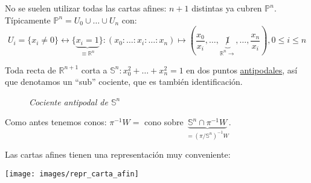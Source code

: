 \begin{defi}
No se suelen utilizar todas las cartas afines: $n + 1$ distintas ya cubren $\mathbb{P}^{n}$. Típicamente $\mathbb{P}^{n} = U_0 \cup \ldots \cup U_n$ con:
\[
    U_i = \{x_i \neq 0\} \leftrightarrow \{\underbrace{x_i = 1}_{\equiv \mathbb{R}^n}\}: \left( x_0 : \ldots : x_i : \ldots : x_n \right) \mapsto \left( \frac{x_0}{x_i}, \ldots, \underbrace{\not1}_{\mathbb{R}^n \rightarrow}, \ldots, \frac{x_n}{x_i} \right), 0 \le i \le n
\]
\end{defi}

\begin{prop}
    Toda recta de $\mathbb{R}^{n + 1}$ corta a $\mathbb{S}^{n}: x_0^2 + \ldots + x_n^2 = 1$ en dos puntos \underline{antipodales}, así que denotamos un ``sub'' cociente, que es también identificación.
    \begin{figure}[H]
        \centering
        \caption{\textit{Cociente antipodal de $\mathbb{S}^n$}}
        \label{fig:cociente_antipodal_Sn}
    \end{figure}
\end{prop}
\begin{demo} 
    Como antes tenemos conos: $\pi^{-1}W = $ cono sobre $\underbrace{\mathbb{S}^n \cap \pi^{-1}W}_{= \left( \pi / \mathbb{S}^n \right)^{-1} W}$.
\end{demo}
\begin{obs}
    Las cartas afines tienen una representación muy conveniente:
    \begin{center}
        \texttt{[image: images/repr\_carta\_afin]} 
    \end{center}
\end{obs}

